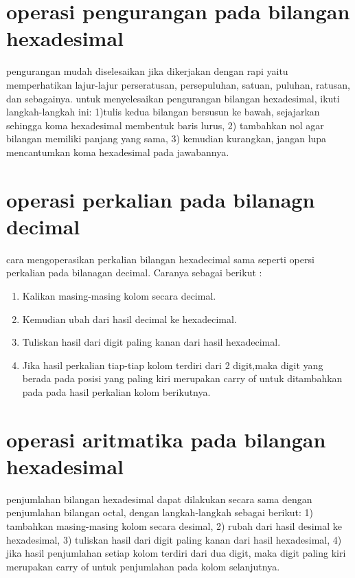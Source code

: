 \section{operasi pengurangan pada bilangan hexadesimal}
pengurangan mudah diselesaikan jika dikerjakan dengan rapi yaitu memperhatikan lajur-lajur perseratusan, persepuluhan, satuan, puluhan, ratusan, dan sebagainya. untuk menyelesaikan pengurangan bilangan hexadesimal, ikuti langkah-langkah ini: 1)tulis kedua bilangan bersusun ke bawah, sejajarkan sehingga koma hexadesimal membentuk baris lurus, 2) tambahkan nol agar bilangan memiliki panjang yang sama, 3) kemudian kurangkan, jangan lupa mencantumkan koma hexadesimal pada jawabannya.
\section{operasi perkalian pada bilanagn decimal}
cara mengoperasikan perkalian bilangan hexadecimal sama seperti opersi perkalian pada bilanagan decimal. Caranya sebagai berikut :
\begin{enumerate}	
\item Kalikan masing-masing kolom secara decimal.
\item Kemudian ubah dari hasil decimal ke hexadecimal.
\item Tuliskan hasil dari digit paling kanan dari hasil hexadecimal.
\item Jika hasil perkalian tiap-tiap kolom terdiri dari 2 digit,maka digit yang berada pada posisi yang paling kiri merupakan carry of untuk ditambahkan pada pada hasil perkalian kolom berikutnya.
\end{enumerate}

\section{operasi aritmatika pada bilangan hexadesimal}
penjumlahan bilangan hexadesimal dapat dilakukan secara sama dengan penjumlahan bilangan octal, dengan langkah-langkah sebagai berikut: 1) tambahkan masing-masing kolom secara desimal, 2) rubah dari hasil desimal ke hexadesimal, 3) tuliskan hasil dari digit paling kanan dari hasil hexadesimal, 4) jika hasil penjumlahan setiap kolom terdiri dari dua digit, maka digit paling kiri merupakan carry of untuk penjumlahan pada kolom selanjutnya.

